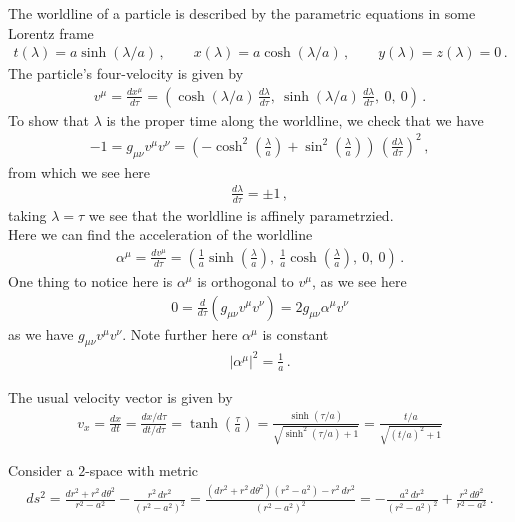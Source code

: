\documentclass[11pt, onesided]{book}
\theoremstyle{break}
\theoremstyle{break}
\begin{document}
\newpage
The worldline of a particle is described by the parametric equations in some Lorentz frame
\begin{align*}
t(\lambda) = a\sinh(\lambda/a) \,,\qquad
x(\lambda) = a\cosh(\lambda/a)\,,\qquad
y(\lambda) = z(\lambda) = 0\,.
\end{align*}
The particle's four-velocity is given by
\begin{align*}
v^\mu = \frac{dx^\mu}{d\tau} = \left( \cosh(\lambda/a) \, \frac{d\lambda}{d\tau},\ \sinh(\lambda/a)\,\frac{d\lambda}{d\tau},\ 0,\ 0\right)\,.
\end{align*}
To show that $\lambda$ is the proper time along the worldline, we check that we have
\begin{align*}
-1 = g_{\mu\nu}v^\mu v^\nu = \left(
-\cosh^2\left(\frac{\lambda}{a}\right) + \sin^2\left( \frac{\lambda}{a}\right)\right) \,\left( \frac{d\lambda}{d\tau}\right)^2\,,
\end{align*}
from which we see here
\begin{align*}
\frac{d\lambda}{d\tau} = \pm 1\,,
\end{align*}
taking $\lambda = \tau$ we see that the worldline is affinely parametrzied. \\

Here we can find the acceleration of the worldline
\begin{align*}
\alpha^\mu = \frac{dv^\mu}{d\tau} = \left( \frac{1}{a}\sinh\left( \frac{\lambda}{a}\right),\ \frac{1}{a}\cosh\left( \frac{\lambda}{a}\right),\ 0,\ 0\right)\,.
\end{align*}
One thing to notice here is $\alpha^\mu$ is orthogonal to $v^\mu$, as we see here
\begin{align*}
0 = \frac{d}{d\tau}\left( g_{\mu\nu}v^\mu v^\nu\right) = 2g_{\mu\nu}\alpha^\mu v^\nu
\end{align*}
as we have $g_{\mu\nu}v^\mu v^\nu$. Note further here $\alpha^\mu$ is constant 
\begin{align*}
|\alpha^\mu|^2 = \frac{1}{a}\,.
\end{align*}

The usual velocity vector is given by
\begin{align*}
v_x = \frac{dx}{dt} = \frac{dx/d\tau}{dt/d\tau} = \tanh\left( \frac{\tau}{a}\right) = \frac{\sinh(\tau/a)}{\sqrt{\sinh^2(\tau/a) + 1}} = \frac{t/a}{\sqrt{(t/a)^2+1}}
\end{align*}


\newpage
Consider a $2$-space with metric
\begin{align*}
ds^2 = \frac{dr^2 + r^2\, d\theta^2}{r^2 - a^2} - \frac{r^2 \, dr^2}{(r^2 - a^2)^2} =\frac{(dr^2 + r^2\, d\theta^2)(r^2 - a^2) - r^2 \,dr^2}{(r^2 - a^2)^2} =-\frac{a^2\, dr^2}{(r^2 - a^2)^2} + \frac{r^2\, d\theta^2}{r^2 - a^2}\,.
\end{align*}
\end{document}
